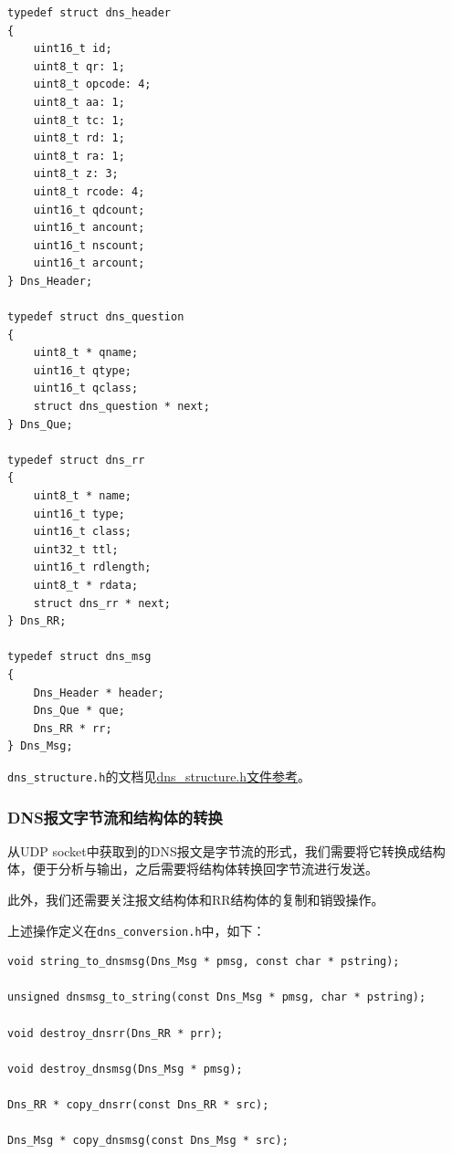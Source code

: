 \documentclass[lang=cn,11pt,a4paper,cite=authornum]{paper}
\begin{document}
\begin{code}
\begin{verbatim}
typedef struct dns_header
{
    uint16_t id;
    uint8_t qr: 1;
    uint8_t opcode: 4;
    uint8_t aa: 1;
    uint8_t tc: 1;
    uint8_t rd: 1;
    uint8_t ra: 1;
    uint8_t z: 3;
    uint8_t rcode: 4;
    uint16_t qdcount;
    uint16_t ancount;
    uint16_t nscount;
    uint16_t arcount;
} Dns_Header;
 
typedef struct dns_question
{
    uint8_t * qname;
    uint16_t qtype;
    uint16_t qclass;
    struct dns_question * next;
} Dns_Que;
 
typedef struct dns_rr
{
    uint8_t * name;
    uint16_t type;
    uint16_t class;
    uint32_t ttl;
    uint16_t rdlength;
    uint8_t * rdata;
    struct dns_rr * next;
} Dns_RR;
 
typedef struct dns_msg
{
    Dns_Header * header; 
    Dns_Que * que; 
    Dns_RR * rr; 
} Dns_Msg;
\end{verbatim}
\end{code}

\texttt{dns_structure.h}的文档见\href{run:./APIdoc/dns__structure_8h.html}{dns\_structure.h文件参考}。

\subsubsection{DNS报文字节流和结构体的转换}

从UDP socket中获取到的DNS报文是字节流的形式，我们需要将它转换成结构体，便于分析与输出，之后需要将结构体转换回字节流进行发送。

此外，我们还需要关注报文结构体和RR结构体的复制和销毁操作。

上述操作定义在\texttt{dns_conversion.h}中，如下：

\begin{code}
\begin{verbatim}
void string_to_dnsmsg(Dns_Msg * pmsg, const char * pstring);

unsigned dnsmsg_to_string(const Dns_Msg * pmsg, char * pstring);
 
void destroy_dnsrr(Dns_RR * prr);
 
void destroy_dnsmsg(Dns_Msg * pmsg);
 
Dns_RR * copy_dnsrr(const Dns_RR * src);
 
Dns_Msg * copy_dnsmsg(const Dns_Msg * src);
\end{verbatim}
\end{code}
\end{document}

